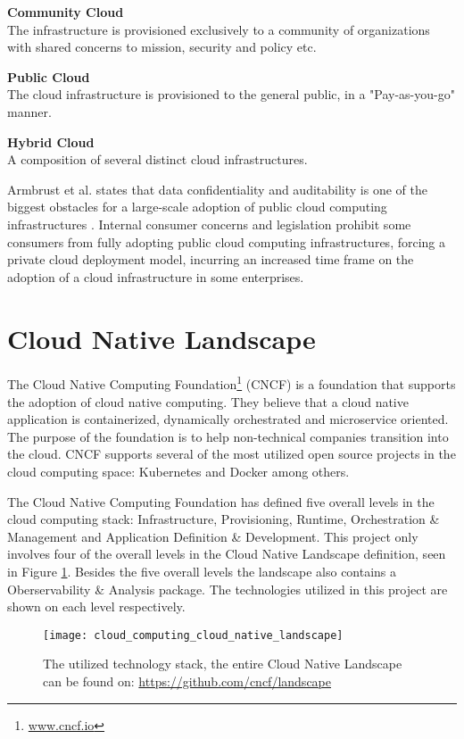 \textbf{Community Cloud}\\
The infrastructure is provisioned exclusively to a community of organizations with shared concerns to mission, security and policy etc.

\textbf{Public Cloud}\\
The cloud infrastructure is provisioned to the general public, in a "Pay-as-you-go" manner.

\textbf{Hybrid Cloud}\\
A composition of several distinct cloud infrastructures.


Armbrust et al. states that data confidentiality and auditability is one of the biggest obstacles for a large-scale adoption of public cloud computing infrastructures \cite{armbrust2010view}. Internal consumer concerns and legislation prohibit some consumers from fully adopting public cloud computing infrastructures, forcing a private cloud deployment model, incurring an increased time frame on the adoption of a cloud infrastructure in some enterprises.

\section{Cloud Native Landscape}
The Cloud Native Computing Foundation\footnote{\url{www.cncf.io}} (CNCF) is a foundation that supports the adoption of cloud native computing. They believe that a cloud native application is containerized, dynamically orchestrated and microservice oriented. The purpose of the foundation is to help non-technical companies transition into the cloud. CNCF supports several of the most utilized open source projects in the cloud computing space: Kubernetes and Docker among others.

The Cloud Native Computing Foundation has defined five overall levels in the cloud computing stack: Infrastructure, Provisioning, Runtime, Orchestration \& Management and Application Definition \& Development. This project only involves four of the overall levels in the Cloud Native Landscape definition, seen in Figure \ref{fig:cloud_computing_cloud_native_landscape}. Besides the five overall levels the landscape also contains a Oberservability \& Analysis package. The technologies utilized in this project are shown on each level respectively.

\begin{figure}[!htb]
\begin{center}
  \texttt{[image: cloud\_computing\_cloud\_native\_landscape]}  
  \caption{The utilized technology stack, the entire Cloud Native Landscape can be found on: \url{https://github.com/cncf/landscape}}
  \label{fig:cloud_computing_cloud_native_landscape}
\end{center}
\end{figure}

